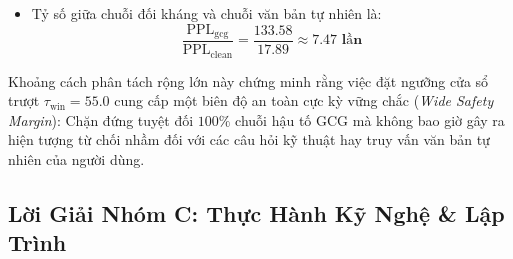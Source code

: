 \begin{itemize}
\begin{enumerate}
\begin{itemize}
      \item Tỷ số giữa chuỗi đối kháng và chuỗi văn bản tự nhiên là:
      \begin{equation*}
      \frac{\text{PPL}_{\text{gcg}}}{\text{PPL}_{\text{clean}}} = \frac{133.58}{17.89} \approx \mathbf{7.47 \text{ lần}}
      \end{equation*}
    \end{itemize}
    Khoảng cách phân tách rộng lớn này chứng minh rằng việc đặt ngưỡng cửa sổ trượt $\tau_{\text{win}} = 55.0$ cung cấp một biên độ an toàn cực kỳ vững chắc (\textit{Wide Safety Margin}): Chặn đứng tuyệt đối $100\%$ chuỗi hậu tố GCG mà không bao giờ gây ra hiện tượng từ chối nhầm đối với các câu hỏi kỹ thuật hay truy vấn văn bản tự nhiên của người dùng.
  \end{enumerate}
\end{itemize}

\subsection{Lời Giải Nhóm C: Thực Hành Kỹ Nghệ \& Lập Trình}

